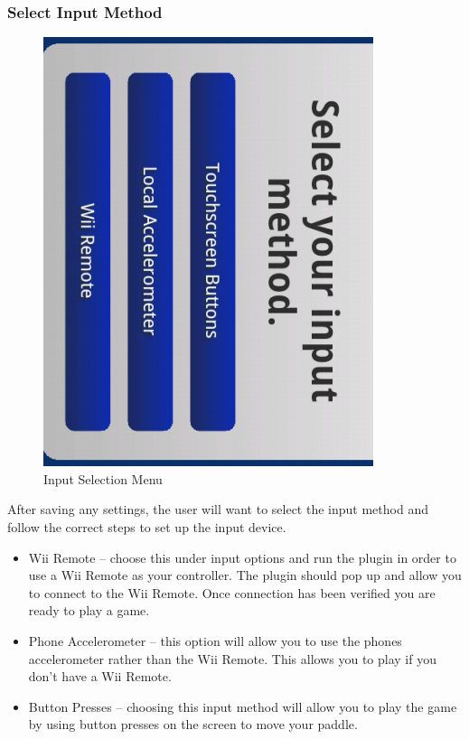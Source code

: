 \documentclass[12pt]{article}
\begin{document}
\subsubsection{Select Input Method}
\begin{figure}
\begin{center}
\includegraphics[scale=.7]{ selectInputMethod-Android.png}
\caption{\label{Input Selection Interface}Input Selection Menu}
\end{center}
\end{figure}

After saving any settings, the user will want to select the input method and follow the correct steps to set up the input device.
\begin{itemize}
\item Wii Remote – choose this under input options and run the plugin in order to use a Wii Remote as your controller. The plugin should pop up and allow you to connect to the Wii Remote. Once connection has been verified you are ready to play a game.
\item Phone Accelerometer – this option will allow you to use the phones accelerometer rather than the Wii Remote. This allows you to play if you don’t have a Wii Remote.
\item Button Presses – choosing this input method will allow you to play the game by using button presses on the screen to move your paddle.
\end{itemize}
\end{document}
